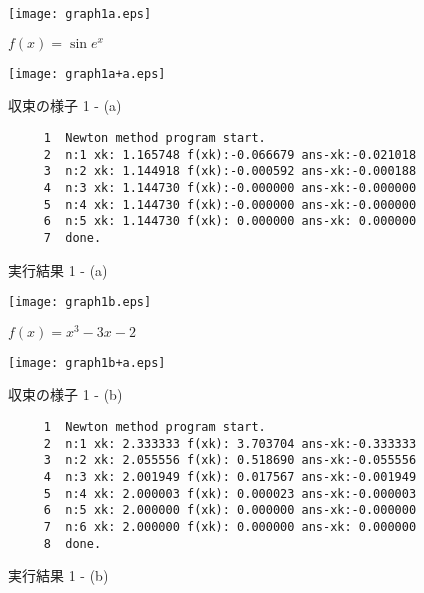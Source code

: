 \documentclass[12pt]{jarticle}
\renewcommand  \[  {\begin{eqnarray}}
\renewcommand  \]  {\end{eqnarray}}
\begin{document}
\begin{figure}[t]
 \begin{minipage}{7.95cm}
  \center
  \texttt{[image: graph1a.eps]}
  \caption{$f(x)=\sin e^x$}
  \label{fig:1a}
 \end{minipage}
 \begin{minipage}{7.95cm}
  \center
  \texttt{[image: graph1a+a.eps]}
  \caption{収束の様子 1 - (a)}
  \label{fig:1a+a}
 \end{minipage}
\begin{screen}
\begin{verbatim}
     1	Newton method program start.
     2	n:1 xk: 1.165748 f(xk):-0.066679 ans-xk:-0.021018
     3	n:2 xk: 1.144918 f(xk):-0.000592 ans-xk:-0.000188
     4	n:3 xk: 1.144730 f(xk):-0.000000 ans-xk:-0.000000
     5	n:4 xk: 1.144730 f(xk):-0.000000 ans-xk:-0.000000
     6	n:5 xk: 1.144730 f(xk): 0.000000 ans-xk: 0.000000
     7	done.
\end{verbatim}
\end{screen}
\caption{実行結果 1 - (a)}
\label{fig:1aa}
\end{figure}

\begin{figure}[t]
 \begin{minipage}{7.95cm}
  \center
  \texttt{[image: graph1b.eps]}
  \caption{$f(x)=x^3-3x-2$}
  \label{fig:1b}
 \end{minipage}
 \begin{minipage}{7.95cm}
  \center
  \texttt{[image: graph1b+a.eps]}
  \caption{収束の様子 1 - (b)}
  \label{fig:1b+a}
 \end{minipage}
\begin{screen}
\begin{verbatim}
     1	Newton method program start.
     2	n:1 xk: 2.333333 f(xk): 3.703704 ans-xk:-0.333333
     3	n:2 xk: 2.055556 f(xk): 0.518690 ans-xk:-0.055556
     4	n:3 xk: 2.001949 f(xk): 0.017567 ans-xk:-0.001949
     5	n:4 xk: 2.000003 f(xk): 0.000023 ans-xk:-0.000003
     6	n:5 xk: 2.000000 f(xk): 0.000000 ans-xk:-0.000000
     7	n:6 xk: 2.000000 f(xk): 0.000000 ans-xk: 0.000000
     8	done.
\end{verbatim}
\end{screen}
\caption{実行結果 1 - (b)}
\label{fig:1bb}
\end{figure}
\end{document}
